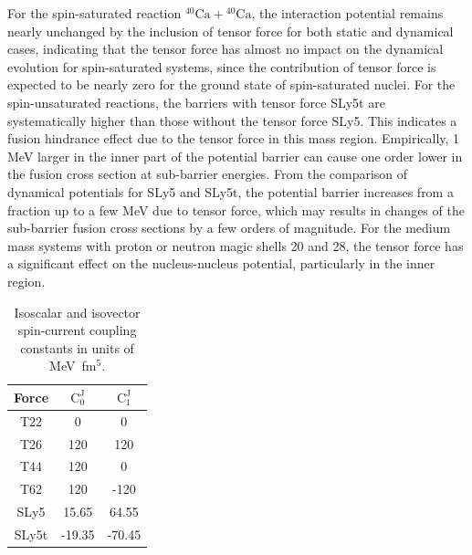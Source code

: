 For the spin-saturated reaction $^{40}\mathrm{Ca}+\mathrm{^{40}Ca}$, the interaction potential remains nearly unchanged by the inclusion of tensor force
for both static and dynamical cases, indicating that the tensor force has almost no impact on the dynamical evolution for spin-saturated systems,
since the contribution of tensor force is expected to be nearly zero for the ground state of spin-saturated nuclei.
For the spin-unsaturated reactions, the barriers with tensor force SLy5t are systematically higher than those without the tensor force SLy5.
This indicates a fusion hindrance effect due to the tensor force in this mass region. Empirically, 1 MeV larger in the inner part of the potential barrier
can cause one order lower in the fusion cross section at sub-barrier energies. From the comparison of dynamical potentials for SLy5 and SLy5t,
the potential barrier increases from a fraction up to a few MeV due to tensor force, which may results in changes of the sub-barrier fusion cross sections by a few orders of magnitude. For the medium mass systems
with proton or neutron magic shells 20 and 28, the tensor force has a significant effect on the nucleus-nucleus potential, particularly in the inner region.

\begin{table}[!hbt]
	\centering
	\caption{Isoscalar and isovector spin-current coupling constants in units of MeV~fm$^5$.\hfill\phantom{.}}
	\label{tab:CC}
	\begin{tabular}{c c c}
		Force & $\mathrm{C}^\mathrm{J}_0$ & $\mathrm{C}^\mathrm{J}_1$  \\
		\hline
		T22   &     0   &      0   \\
		T26   &   120   &    120   \\
		T44   &   120   &      0   \\
		T62   &   120   &   -120   \\
		SLy5  &  15.65  &    64.55  \\
		SLy5t & -19.35  &   -70.45
	\end{tabular}
\end{table}

